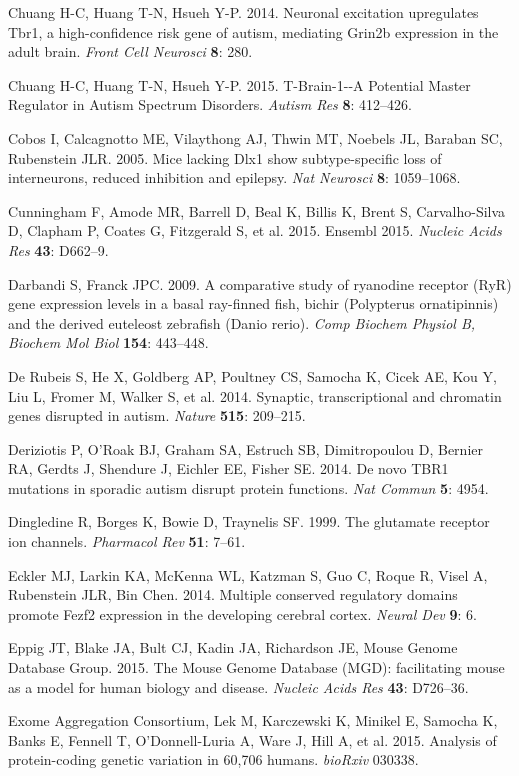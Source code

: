 \documentclass[]{article}
\begin{document}
Chuang H-C, Huang T-N, Hsueh Y-P. 2014. Neuronal excitation upregulates
Tbr1, a high-confidence risk gene of autism, mediating Grin2b expression
in the adult brain. \emph{Front Cell Neurosci} \textbf{8}: 280.

Chuang H-C, Huang T-N, Hsueh Y-P. 2015. T-Brain-1-\/-A Potential Master
Regulator in Autism Spectrum Disorders. \emph{Autism Res} \textbf{8}:
412--426.

Cobos I, Calcagnotto ME, Vilaythong AJ, Thwin MT, Noebels JL, Baraban
SC, Rubenstein JLR. 2005. Mice lacking Dlx1 show subtype-specific loss
of interneurons, reduced inhibition and epilepsy. \emph{Nat Neurosci}
\textbf{8}: 1059--1068.

Cunningham F, Amode MR, Barrell D, Beal K, Billis K, Brent S,
Carvalho-Silva D, Clapham P, Coates G, Fitzgerald S, et al. 2015.
Ensembl 2015. \emph{Nucleic Acids Res} \textbf{43}: D662--9.

Darbandi S, Franck JPC. 2009. A comparative study of ryanodine receptor
(RyR) gene expression levels in a basal ray-finned fish, bichir
(Polypterus ornatipinnis) and the derived euteleost zebrafish (Danio
rerio). \emph{Comp Biochem Physiol B, Biochem Mol Biol} \textbf{154}:
443--448.

De Rubeis S, He X, Goldberg AP, Poultney CS, Samocha K, Cicek AE, Kou Y,
Liu L, Fromer M, Walker S, et al. 2014. Synaptic, transcriptional and
chromatin genes disrupted in autism. \emph{Nature} \textbf{515}:
209--215.

Deriziotis P, O'Roak BJ, Graham SA, Estruch SB, Dimitropoulou D, Bernier
RA, Gerdts J, Shendure J, Eichler EE, Fisher SE. 2014. De novo TBR1
mutations in sporadic autism disrupt protein functions. \emph{Nat
Commun} \textbf{5}: 4954.

Dingledine R, Borges K, Bowie D, Traynelis SF. 1999. The glutamate
receptor ion channels. \emph{Pharmacol Rev} \textbf{51}: 7--61.

Eckler MJ, Larkin KA, McKenna WL, Katzman S, Guo C, Roque R, Visel A,
Rubenstein JLR, Bin Chen. 2014. Multiple conserved regulatory domains
promote Fezf2 expression in the developing cerebral cortex. \emph{Neural
Dev} \textbf{9}: 6.

Eppig JT, Blake JA, Bult CJ, Kadin JA, Richardson JE, Mouse Genome
Database Group. 2015. The Mouse Genome Database (MGD): facilitating
mouse as a model for human biology and disease. \emph{Nucleic Acids Res}
\textbf{43}: D726--36.

Exome Aggregation Consortium, Lek M, Karczewski K, Minikel E, Samocha K,
Banks E, Fennell T, O'Donnell-Luria A, Ware J, Hill A, et al. 2015.
Analysis of protein-coding genetic variation in 60,706 humans.
\emph{bioRxiv} 030338.
\end{document}
